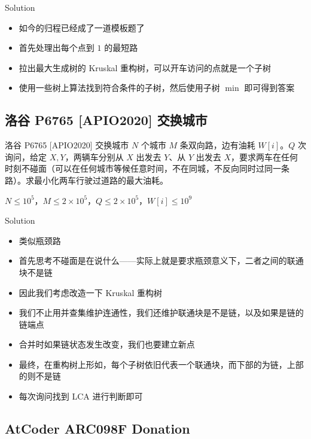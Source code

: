 ﻿\documentclass[aspectratio=169]{ctexbeamer}
\begin{document}
\begin{frame}{Solution}
    \begin{itemize}
        \item 如今的归程已经成了一道模板题了
        \item 首先处理出每个点到 $ 1 $ 的最短路
        \item 拉出最大生成树的 Kruskal 重构树，可以开车访问的点就是一个子树
        \item 使用一些树上算法找到符合条件的子树，然后使用子树 $\min$ 即可得到答案
    \end{itemize}
\end{frame}

\subsection{洛谷 P6765 [APIO2020] 交换城市}

\begin{frame}{洛谷 P6765 [APIO2020] 交换城市}
      $N$ 个城市 $M$ 条双向路，边有油耗 $W[i]$。$Q$ 次询问，给定 $X,Y$，两辆车分别从 $X$ 出发去 $Y$、从 $Y$ 出发去 $X$，要求两车在任何时刻不碰面（可以在任何城市等候任意时间，不在同城，不反向同时过同一条路）。求最小化两车行驶过道路的最大油耗。
      
      $N\le 10^5$，$M\le 2\times 10^5$，$Q\le 2\times 10^5$，$W[i]\le 10^9$
\end{frame}

\begin{frame}{Solution}
    \begin{itemize}
        \item 类似瓶颈路
        \item 首先思考不碰面是在说什么——实际上就是要求瓶颈意义下，二者之间的联通块不是链
        \item 因此我们考虑改造一下 Kruskal 重构树
        \item 我们不止用并查集维护连通性，我们还维护联通块是不是链，以及如果是链的链端点
        \item 合并时如果链状态发生改变，我们也要建立新点
        \item 最终，在重构树上形如，每个子树依旧代表一个联通块，而下部的为链，上部的则不是链
        \item 每次询问找到 LCA 进行判断即可
    \end{itemize}
\end{frame}


\subsection{AtCoder ARC098F Donation}
\end{document}
